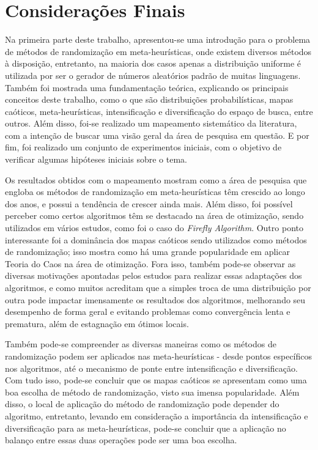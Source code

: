 \chapter{Considerações Finais}




Na primeira parte deste trabalho, apresentou-se uma introdução para o problema de métodos de randomização em meta-heurísticas, onde existem diversos métodos à disposição, entretanto, na maioria dos casos apenas a distribuição uniforme é utilizada por ser o gerador de números aleatórios padrão de muitas linguagens. Também foi mostrada uma fundamentação teórica, explicando os principais conceitos deste trabalho, como o que são distribuições probabilísticas, mapas caóticos, meta-heurísticas, intensificação e diversificação do espaço de busca, entre outros. Além disso, foi-se realizado um mapeamento sistemático da literatura, com a intenção de buscar uma visão geral da área de pesquisa em questão. E por fim, foi realizado um conjunto de experimentos iniciais, com o objetivo de verificar algumas hipóteses iniciais sobre o tema.

Os resultados obtidos com o mapeamento mostram como a área de pesquisa que engloba os métodos de randomização em meta-heurísticas têm crescido ao longo dos anos, e possui a tendência de crescer ainda mais. Além disso, foi possível perceber como certos algoritmos têm se destacado na área de otimização, sendo utilizados em vários estudos, como foi o caso do \textit{Firefly Algorithm}. Outro ponto interessante foi a dominância dos mapas caóticos sendo utilizados como métodos de randomização; isso mostra como há uma grande popularidade em aplicar Teoria do Caos na área de otimização. Fora isso, também pode-se observar as diversas motivações apontadas pelos estudos para realizar essas adaptações dos algoritmos, e como muitos acreditam que a simples troca de uma distribuição por outra pode impactar imensamente os resultados dos algoritmos, melhorando seu desempenho de forma geral e evitando problemas como convergência lenta e prematura, além de estagnação em ótimos locais.

Também pode-se compreender as diversas maneiras como os métodos de randomização podem ser aplicados nas meta-heurísticas - desde pontos específicos nos algoritmos, até o mecanismo de ponte entre intensificação e diversificação. Com tudo isso, pode-se concluir que os mapas caóticos se apresentam como uma boa escolha de método de randomização, visto sua imensa popularidade. Além disso, o local de aplicação do método de randomização pode depender do algoritmo, entretanto, levando em consideração a importância da intensificação e diversificação para as meta-heurísticas, pode-se concluir que a aplicação no balanço entre essas duas operações pode ser uma boa escolha.

